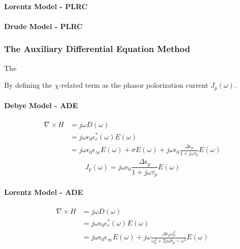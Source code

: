\paragraph{{\msjh Lorentz Model - PLRC}}

\paragraph{{\msjh Drude Model - PLRC}}

\subsubsection{The Auxiliary Differential Equation Method}
The 

By defining the $\chi$-related term as the phasor polorization current $J_p(\omega)$.
\paragraph{{\msjh Debye Model - ADE}}
\begin{equation}
  \begin{split}
    \nabla \times H & = j\omega D(\omega)\\
    & = j\omega \epsilon_0\epsilon_r^*(\omega)E(\omega)\\
    & = j\omega \epsilon_0 \epsilon_{\infty}E(\omega) + \sigma E(\omega) + j\omega \epsilon_0 \frac{\Delta \epsilon_p}{1+j\omega \tau_p}E(\omega)
  \end{split}
\end{equation}
\begin{equation}
  J_p(\omega) = j\omega \epsilon_0 \frac{\Delta \epsilon_p}{1+j\omega \tau_p}E(\omega)
\end{equation}


\paragraph{{\msjh Lorentz Model - ADE}}
\begin{equation}
  \begin{split}
    \nabla \times H & = j\omega D(\omega)\\
    & = j\omega \epsilon_0\epsilon_r^*(\omega)E(\omega)\\
    & = j\omega \epsilon_0\epsilon_{\infty}E(\omega) + j\omega \frac{\Delta \epsilon_p \omega_p^2}{\omega_p^2+2j\omega\delta_p-\omega^2}E(\omega)
  \end{split}
\end{equation}

